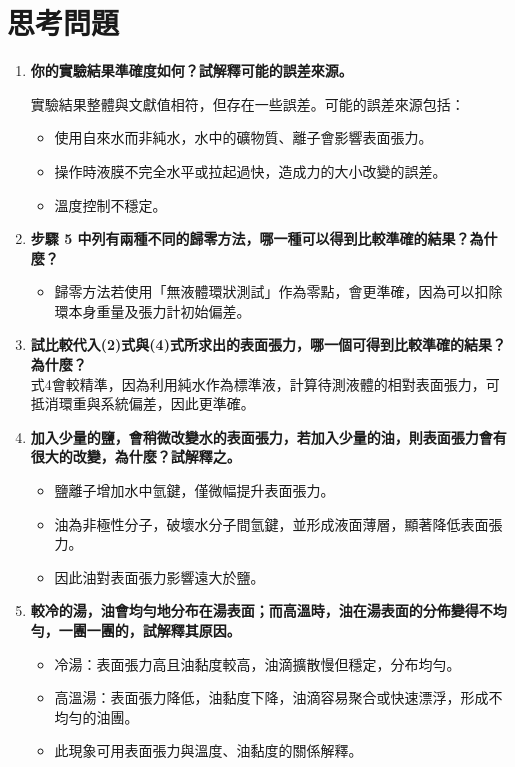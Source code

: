 \documentclass[12pt]{article}
\begin{document}
\section{\textbf{思考問題}}
\begin{enumerate}
    \item \textbf{你的實驗結果準確度如何？試解釋可能的誤差來源。}

    \noindent
    實驗結果整體與文獻值相符，但存在一些誤差。可能的誤差來源包括：
    \begin{itemize}
        \item 使用自來水而非純水，水中的礦物質、離子會影響表面張力。
        \item 操作時液膜不完全水平或拉起過快，造成力的大小改變的誤差。
        \item 溫度控制不穩定。
    \end{itemize}

    \item \textbf{步驟 5 中列有兩種不同的歸零方法，哪一種可以得到比較準確的結果？為什麼？}
    \noindent
    \begin{itemize}
        \item 歸零方法若使用「無液體環狀測試」作為零點，會更準確，因為可以扣除環本身重量及張力計初始偏差。
    \end{itemize}

    \item \textbf{試比較代入(2)式與(4)式所求出的表面張力，哪一個可得到比較準確的結果？為什麼？}
    \noindent
    \\
    式4會較精準，因為利用純水作為標準液，計算待測液體的相對表面張力，可抵消環重與系統偏差，因此更準確。
    
    \item \textbf{加入少量的鹽，會稍微改變水的表面張力，若加入少量的油，則表面張力會有很大的改變，為什麼？試解釋之。}

    \noindent
    \begin{itemize}
        \item 鹽離子增加水中氫鍵，僅微幅提升表面張力。
        \item 油為非極性分子，破壞水分子間氫鍵，並形成液面薄層，顯著降低表面張力。
        \item 因此油對表面張力影響遠大於鹽。
    \end{itemize}

    \item \textbf{較冷的湯，油會均勻地分布在湯表面；而高溫時，油在湯表面的分佈變得不均勻，一團一團的，試解釋其原因。}

    \noindent
    \begin{itemize}
        \item 冷湯：表面張力高且油黏度較高，油滴擴散慢但穩定，分布均勻。
        \item 高溫湯：表面張力降低，油黏度下降，油滴容易聚合或快速漂浮，形成不均勻的油團。
        \item 此現象可用表面張力與溫度、油黏度的關係解釋。    
    \end{itemize}

\end{enumerate}


\noindent

\renewcommand{\refname}{參考文獻}


\end{document}
